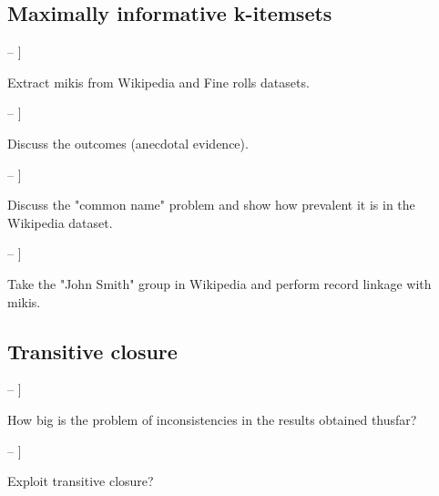 \documentclass[11pt]{article}
\newcommand{\MyCheckedBox}{\makebox[0pt][l]{$\square$}\raisebox{.15ex}{\hspace{0.1em}$\checkmark$}}
\newcommand{\MyCheckBox}{\makebox[0pt][l]{$\square$}\raisebox{.15ex}}
\let\oldmarginpar\marginpar
\renewcommand\marginpar[1]{\-\oldmarginpar[\raggedleft #1]%
{\raggedright #1}}
\newenvironment{checklist}{%
  \begin{list}{}{}%
  \let\olditem\item
  \renewcommand\item{\olditem -- \marginpar{\MyCheckBox} }
  \newcommand\checkeditem{\olditem -- \marginpar{\MyCheckedBox} }
}{%
  \end{list}
}
\begin{document}
\subsection{Maximally informative k-itemsets}
\begin{checklist}
    \item Extract mikis from Wikipedia and Fine rolls datasets.
    \item Discuss the outcomes (anecdotal evidence).
    \item Discuss the "common name" problem and show how prevalent it is in the Wikipedia dataset.
    \item Take the "John Smith" group in Wikipedia and perform record linkage with mikis.
\end{checklist}

\subsection{Transitive closure}
\begin{checklist}
    \item How big is the problem of inconsistencies in the results obtained thusfar?
    \item Exploit transitive closure?
\end{checklist}
\end{document}

